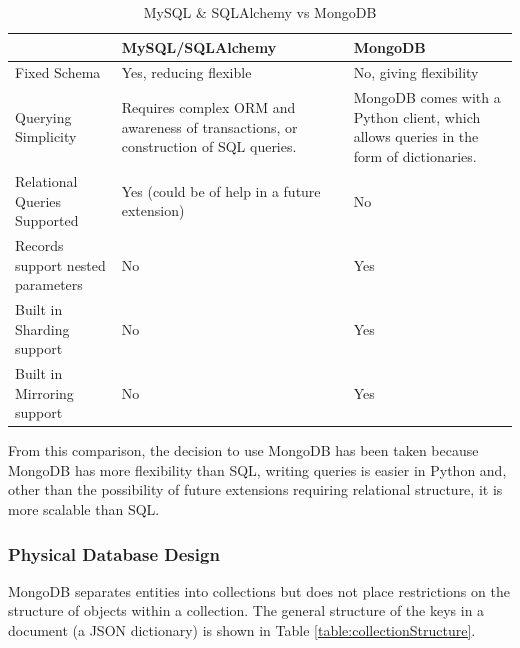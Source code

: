 \documentclass[authoryearcitations]{UoYCSproject}
\begin{document}
\begin{table}
\begin{center}
    \begin{tabular}{| p{3.8cm} | p{4.0cm} | p{4.6cm} |}
    \hline
     & MySQL/SQLAlchemy & MongoDB \\ \hline
    Fixed Schema & Yes, reducing flexible & No, giving flexibility \\ \hline
    Querying Simplicity & Requires complex ORM and awareness of transactions, or construction of SQL queries. & MongoDB comes with a Python client, which allows queries in the form of dictionaries. \\ \hline
    Relational Queries Supported & Yes (could be of help in a future extension) & No \\ \hline
    Records support nested parameters & No & Yes \\ \hline
    Built in Sharding support & No & Yes \\ \hline
    Built in Mirroring support & No & Yes \\ \hline
    \end{tabular}
    \caption{MySQL \& SQLAlchemy vs MongoDB}
    \label{table:mysqlVsMongo}
\end{center}
\end{table}

From this comparison, the decision to use MongoDB has been taken because MongoDB has more flexibility than SQL, writing queries is easier in Python and, other than the possibility of future extensions requiring relational structure, it is more scalable than SQL.

\subsubsection{Physical Database Design}
MongoDB separates entities into collections but does not place restrictions on the structure of objects within a collection.  The general structure of the keys in a document (a JSON dictionary) is shown in Table \ref{table:collectionStructure}.
\end{document}
